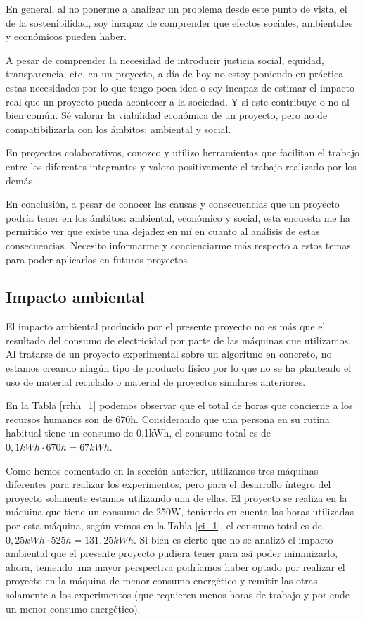 \documentclass[titlepage,12pt]{report}
\begin{document}
En general, al no ponerme a analizar un problema desde este punto de vista, el de la sostenibilidad, soy incapaz de comprender que efectos sociales, ambientales y económicos pueden haber.

A pesar de comprender la necesidad de introducir justicia social, equidad, transparencia, etc. en un proyecto, a día de hoy no estoy poniendo en práctica estas necesidades por lo que tengo poca idea o soy incapaz de estimar el impacto real que un proyecto pueda acontecer a la sociedad. Y si este contribuye o no al bien común.
Sé valorar la viabilidad económica de un proyecto, pero no de compatibilizarla con los ámbitos: ambiental y social.

En proyectos colaborativos, conozco y utilizo herramientas que facilitan el trabajo entre los diferentes integrantes y valoro positivamente el trabajo realizado por los demás.

En conclusión, a pesar de conocer las causas y consecuencias que un proyecto podría tener en los ámbitos: ambiental, económico y social, esta encuesta me ha permitido ver que existe una dejadez en mí en cuanto al análisis de estas consecuencias. Necesito informarme y concienciarme más respecto a estos temas para poder aplicarlos en futuros proyectos.

\subsection{Impacto ambiental}

El impacto ambiental producido por el presente proyecto no es más que el resultado del consumo de electricidad por parte de las máquinas que utilizamos. Al tratarse de un proyecto experimental sobre un algoritmo en concreto, no estamos creando ningún tipo de producto físico por lo que no se ha planteado el uso de material reciclado o material de proyectos similares anteriores.

En la Tabla \ref{rrhh_1} podemos observar que el total de horas que concierne a los recursos humanos son de 670h. Considerando que una persona en su rutina habitual tiene un consumo de 0,1kWh, el consumo total es de $0,1kWh \cdot 670h = 67kWh$.

Como hemos comentado en la sección anterior, utilizamos tres máquinas diferentes para realizar los experimentos, pero para el desarrollo íntegro del proyecto solamente estamos utilizando una de ellas. El proyecto se realiza en la máquina que tiene un consumo de 250W, teniendo en cuenta las horas utilizadas por esta máquina, según vemos en la Tabla \ref{ci_1}, el consumo total es de $0,25kWh \cdot 525h = 131,25kWh$. Si bien es cierto que no se analizó el impacto ambiental que el presente proyecto pudiera tener para así poder minimizarlo, ahora, teniendo una mayor perspectiva podríamos haber optado por realizar el proyecto en la máquina de menor consumo energético y remitir las otras solamente a los experimentos (que requieren menos horas de trabajo y por ende un menor consumo energético).
\end{document}

